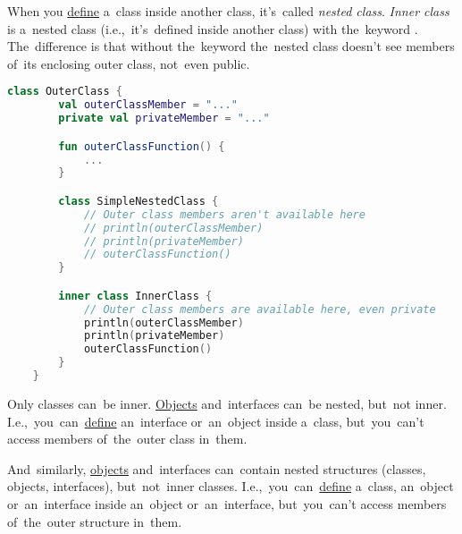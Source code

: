 When you \hyperref[declarationdefinition]{define} a~class inside another class, it's~called \textit{nested class}.
\textit{Inner class} is a~nested class (i.e.,~it's~defined inside another class) with the~keyword .
The~difference is that without the~keyword the~nested class doesn't see members of~its enclosing outer class, not~even public.

\begin{lstlisting}[language=Kotlin]
    class OuterClass {
        val outerClassMember = "..."
        private val privateMember = "..."

        fun outerClassFunction() {
            ...
        }

        class SimpleNestedClass {
            // Outer class members aren't available here
            // println(outerClassMember)
            // println(privateMember)
            // outerClassFunction()
        }

        inner class InnerClass {
            // Outer class members are available here, even private
            println(outerClassMember)
            println(privateMember)
            outerClassFunction()
        }
    }
\end{lstlisting}
\newline

\noindent Only classes can~be inner.
\hyperref[kotlinobject]{Objects} and~interfaces can~be nested, but~not inner.
I.e.,~you~can~\hyperref[declarationdefinition]{define} an~interface or~an~object inside a~class, but~you~can't access members of~the~outer class in~them.

And~similarly, \hyperref[kotlinobject]{objects} and~interfaces can~contain nested structures (classes, objects, interfaces), but~not~inner classes.
I.e.,~you~can~\hyperref[declarationdefinition]{define} a~class, an~object or~an~interface inside an~object or~an~interface,  but~you~can't access members of~the~outer structure in~them.

